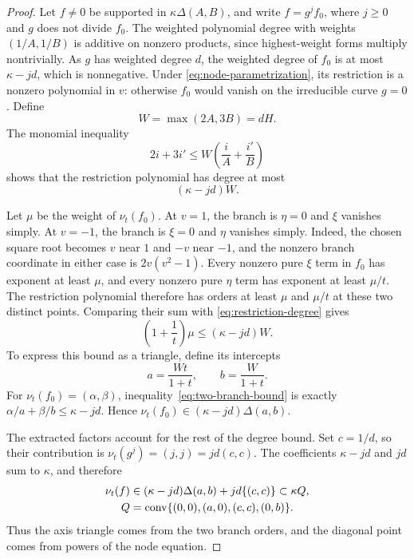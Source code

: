 \begin{proof}
Let $f\ne0$ be supported in $\kappa\Delta(A,B)$, and write $f=g^j f_0$,
where $j\ge0$ and $g$ does not divide $f_0$.
The weighted polynomial degree with weights $(1/A,1/B)$ is additive on
nonzero products, since highest-weight forms multiply nontrivially.  As
$g$ has weighted degree $d$, the weighted degree of $f_0$ is at most
$\kappa-jd$, which is nonnegative.  Under
\eqref{eq:node-parametrization}, its restriction is a nonzero polynomial
in $v$: otherwise $f_0$ would vanish on the irreducible curve $g=0$.
Define
\begin{equation}\label{eq:normalization-degree-constant}
 W=\max(2A,3B)=dH.
\end{equation}
The monomial inequality
\[
 2i+3i'\le W\left(\frac{i}{A}+\frac{i'}{B}\right)
\]
shows that the restriction polynomial has degree at most
\begin{equation}\label{eq:restriction-degree}
 (\kappa-jd)W.
\end{equation}

Let $\mu$ be the weight of $\nu_t(f_0)$.  At $v=1$, the branch is
$\eta=0$ and $\xi$ vanishes simply.  At $v=-1$, the branch is $\xi=0$
and $\eta$ vanishes simply.  Indeed, the chosen square root becomes $v$
near $1$ and $-v$ near $-1$, and the nonzero branch coordinate in either
case is $2v(v^2-1)$.  Every nonzero pure $\xi$ term in $f_0$ has exponent
at least $\mu$, and every nonzero pure $\eta$ term has exponent at least
$\mu/t$.  The restriction polynomial therefore has orders at least
$\mu$ and $\mu/t$ at these two distinct points.  Comparing their sum with
\eqref{eq:restriction-degree} gives
\begin{equation}\label{eq:two-branch-bound}
 \left(1+\frac1t\right)\mu\le(\kappa-jd)W.
\end{equation}
To express this bound as a triangle, define its intercepts
\begin{equation}\label{eq:node-intercepts}
 a=\frac{Wt}{1+t},\qquad b=\frac{W}{1+t}.
\end{equation}
For $\nu_t(f_0)=(\alpha,\beta)$, inequality~\eqref{eq:two-branch-bound}
is exactly $\alpha/a+\beta/b\le\kappa-jd$.  Hence
$\nu_t(f_0)\in(\kappa-jd)\Delta(a,b)$.

The extracted factors account for the rest of the degree bound.  Set
$c=1/d$, so their contribution is
$\nu_t(g^j)=(j,j)=jd(c,c)$.  The coefficients $\kappa-jd$ and $jd$
sum to $\kappa$, and therefore
\begin{equation}\label{eq:node-envelope}
 \begin{split}
 \nu_t(f)&\in(\kappa-jd)\Delta(a,b)+jd\{(c,c)\}\subset\kappa Q,\\
 Q&=\operatorname{conv}\{(0,0),(a,0),(c,c),(0,b)\}.
 \end{split}
\end{equation}
Thus the axis triangle comes from the two branch orders, and the diagonal
point comes from powers of the node equation.


\end{proof}
